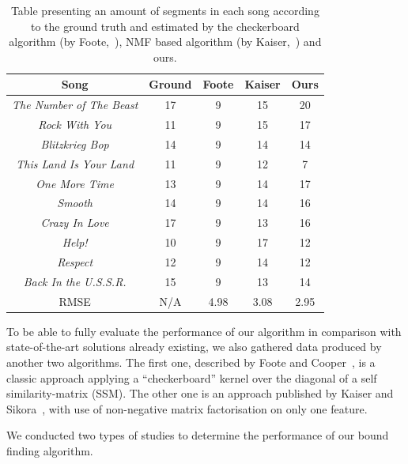 \begin{table}
\begin{center}
\begin{tabular}{| c | c | c | c | c | } \hline 
Song  											& Ground	& Foote 	&  Kaiser 	& Ours \\ \hline \hline
\textit{The Number of The Beast} 	&	17			& 	9  			&  15 		&  20   	\\ \hline
\textit{Rock With You}						&	11			&  9			&  15 		& 17   	\\ \hline
\textit{Blitzkrieg Bop} 						&	14			&  9  			&  14 		& 14   	\\ \hline
\textit{This Land Is Your Land} 		&	11			&  9			&  12 		& 7    	\\ \hline
\textit{One More Time}					&	13			&  9    		&  14 		& 17   	\\ \hline
\textit{Smooth}								&	14			&  9  			&  14 		& 16  	\\ \hline
\textit{Crazy In Love}						&	17			&  9  			&  13  		& 16   	\\ \hline
\textit{Help!}									&	10			&  9		   	&  17 		& 12   	\\ \hline
\textit{Respect}								&	12			&  9  			&  14 		& 12  	\\ \hline
\textit{Back In the U.S.S.R.}				&	15			&  9  			&  13		    	& 14		\\ \hline \hline
RMSE											&	N/A		& 4.98		&  3.08		& 2.95	\\ \hline 

\end{tabular}
\caption{Table presenting an amount of segments in each song according to the ground truth and estimated by the checkerboard algorithm (by Foote,~\cite{FooteCooper}), NMF based algorithm (by Kaiser,~\cite{Sikora}) and ours.}
\label{table:evalStructureCount}
\end{center}
\end{table}


To be able to fully evaluate the performance of our algorithm in comparison with state-of-the-art solutions already existing, we also gathered data produced by another two algorithms. The first one, described by Foote and Cooper~\cite{FooteCooper}, is a classic approach applying a ``checkerboard'' kernel over the diagonal of a self similarity-matrix (SSM). The other one is an approach published by Kaiser and Sikora~\cite{Sikora}, with use of non-negative matrix factorisation on only one feature. 

We conducted two types of studies to determine the performance of our bound finding algorithm.

